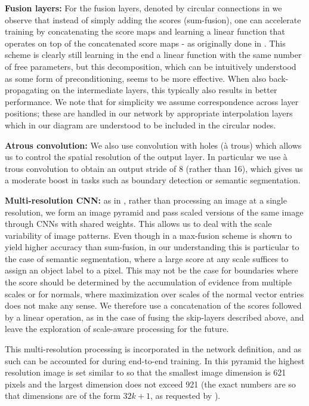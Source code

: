 \documentclass[10pt,twocolumn,letterpaper]{article}
\begin{document}
 	{\textbf{Fusion layers:}}
 	For the fusion layers, denoted by circular connections in  we observe that instead of simply adding the scores (sum-fusion), one can  accelerate training by concatenating {{the score maps}} and learning a linear function that operates on top of the concatenated score maps - as originally done in \cite{hed}. This scheme is clearly still learning in the end a linear function with the same number of free parameters, but this decomposition, which can be intuitively understood as some form of preconditioning, seems to be more effective. When also back-propagating on the intermediate layers, this typically also results in better performance.  We note that for simplicity we  assume   correspondence across layer positions; these are handled in our network by appropriate interpolation layers which in our diagram are understood to be included in the circular nodes. 
 	
\textbf{{Atrous convolution:}}
We also use {{convolution with holes}} (\`a trous) \cite{PapandreouKS15,ChenPK0Y16} which allows us to control the spatial resolution of the output layer. In particular we use \`a trous convolution to obtain an output stride of 8 (rather than 16), which gives us a moderate boost in tasks such as boundary detection or semantic segmentation. 
 	

\textbf{{Multi-resolution CNN:}} as in \cite{jacobs14,PapandreouKS15,iclr16,ChenYWXY15}, rather than processing an image at a single resolution, we form an image pyramid and pass  scaled versions of the same image through CNNs with shared weights. This allows us to deal with the scale variability of image patterns. Even though in \cite{ChenYWXY15} a max-fusion scheme is shown to yield higher accuracy than sum-fusion, in our understanding this is particular to the case of semantic segmentation, where a large score at any scale suffices to assign an object label to a pixel. This may not be the case for boundaries where the score should be determined by the accumulation of evidence from multiple scales \cite{witkin} or for normals, where maximization over scales of the normal vector entries does not make any sense. 
We therefore use a concatenation of the scores followed by a linear operation, as in the case of fusing the skip-layers described above, and leave the exploration of  scale-aware processing \cite{ChenYWXY15} for the future.


This multi-resolution  processing is incorporated in the network definition, and as such can be accounted for during end-to-end training.  
In this pyramid the highest resolution image is set similar to \cite{Girshick15} so that the smallest image dimension is 621 pixels and the largest dimension does not exceed 921 (the exact numbers are so that dimensions are of the form $32k +1$, as requested by \cite{iclr16,ChenYWXY15}).
\end{document}
